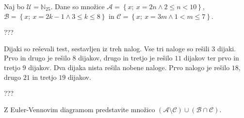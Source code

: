 \documentclass[addpoints]{exam}
\begin{document}
\begin{questions}
    \newpage

    \question
    Naj bo $\mathcal{U}=\mathbb{N}_{25}$. Dane so množice $\mathcal{A}=\left\{x;\ x=2n \land 2\leq n<10\right\}$, $\mathcal{B}=\left\{x;\ x=2k-1 \land 3\leq k\leq 8\right\}$ in $\mathcal{C}=\left\{x;\ x=3m \land 1<m\leq 7\right\}$. 

    \begin{solution}[8cm]
        ???
            \end{solution}


    \question[5]
    Dijaki so reševali test, sestavljen iz treh nalog. Vse tri naloge so rešili $3$ dijaki. 
    Prvo in drugo je rešilo $8$ dijakov, drugo in tretjo je rešilo $11$ dijakov ter prvo in tretjo $9$ dijakov.
    Dva dijaka nista rešila nobene naloge. Prvo nalogo je rešilo $18$, drugo $21$ in tretjo $19$ dijakov.

    \begin{solution}[8cm]
        ???
            \end{solution}




    \newpage
    \question[2]
    Z Euler-Vennovim diagramom predstavite množico $(\mathcal{A}\setminus\mathcal{C})\cup(\mathcal{B}\cap\mathcal{C})$.
    

\end{questions}
\end{document}
